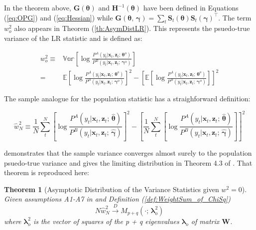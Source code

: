 \documentclass[12pt]{article}
\newcommand{\HI}[1]{\boldsymbol{H}^{-1}(#1)}
\theoremstyle{definition}
\newtheorem{theorem}{Theorem}[section]
\begin{document}
In the theorem above, $\boldsymbol{G}(\boldsymbol{\theta})$ and $\HI{\boldsymbol{\theta}}$
have been defined in Equations (\ref{eq:OPG}) and (\ref{eq:Hessian}) while 
$\boldsymbol{G}(\boldsymbol{\theta}, \, \boldsymbol{\gamma}) = \sum_{t} \boldsymbol{S}_{t}(\boldsymbol{\theta}) \boldsymbol{S}_{t}(\boldsymbol{\gamma})^\top$.
The term $w^{2}_{o}$ also appears in Theorem (\ref{th:AsymDistLR}). This represents
the psuedo-true variance of the LR statistic and is defined as:

\begin{align*}
  w_{o}^{2} \equiv & \mathbb{Var} \left[ \log \frac{ P^{A}(y_{t} | \boldsymbol{x}_{t}, \boldsymbol{z}_{t}; \, \boldsymbol{\theta}^{o}) }{ P^{B}(y_{t} | \boldsymbol{x}_{t}, \boldsymbol{z}_{t}; \, \boldsymbol{\gamma}^{o}) } \right] \\
   = & \mathbb{E} \left[ \log \frac{ P^{A}(y_{t} | \boldsymbol{x}_{t}, \boldsymbol{z}_{t}; \, \boldsymbol{\theta}^{o}) }{ P^{B}(y_{t} | \boldsymbol{x}_{t}, \boldsymbol{z}_{t}; \, \boldsymbol{\gamma}^{o}) } \right]^{2} - \left[ \mathbb{E} \left[ \log \frac{ P^{A}(y_{t} | \boldsymbol{x}_{t}, \boldsymbol{z}_{t}; \, \boldsymbol{\theta}^{o}) }{ P^{B}(y_{t} | \boldsymbol{x}_{t}, \boldsymbol{z}_{t}; \, \boldsymbol{\gamma}^{o}) } \right] \right]^{2}
\end{align*}

The sample analogue for the population statistic has a straighforward definition:

\begin{equation}
  \hat{w}^{2}_{N} \equiv \frac{1}{N} \sum_{t}^{N} \left[ \log \frac{ P^{A}(y_{t} | \boldsymbol{x}_{t}, \boldsymbol{z}_{t}; \, \hat{\boldsymbol{\theta}}) }{ P^{B}(y_{t} | \boldsymbol{x}_{t}, \boldsymbol{z}_{t}; \, \hat{\boldsymbol{\gamma}}) } \right]^{2} - \left[ \frac{1}{N} \sum_{t}^{N} \left[ \log \frac{ P^{A}(y_{t} | \boldsymbol{x}_{t}, \boldsymbol{z}_{t}; \, \hat{\boldsymbol{\theta}}) }{ P^{B}(y_{t} | \boldsymbol{x}_{t}, \boldsymbol{z}_{t}; \, \hat{\boldsymbol{\gamma}}) } \right] \right]^{2}
\end{equation}

\citet{Voung1989} demonstrates that the sample variance converges almost surely
to the population psuedo-true variance and gives the limiting distribution in
Theorem 4.3 of \citet{Voung1989}. That theorem is reproduced here:

\begin{theorem}[Asymptotic Distribution of the Variance Statistics given $w^{2} = 0$] \label{th:AsymDistVar_at_null}
  \emph{Given assumptions A1-A7 in \citet{Voung1989} and Definition (\ref{def:WeightSum_of_ChiSq})
  \begin{equation}
    N \hat{w}^{2}_{N} \overset{D}{\longrightarrow} M_{p+q}(\cdot; \, \boldsymbol{\lambda}^{2}_{o})
  \end{equation}
  where $\boldsymbol{\lambda}^{2}_{o}$ is the vector of squares of the p + q eigenvalues $\boldsymbol{\lambda}_{o}$ of matrix $\boldsymbol{W}$.}
\end{theorem}
\end{document}
